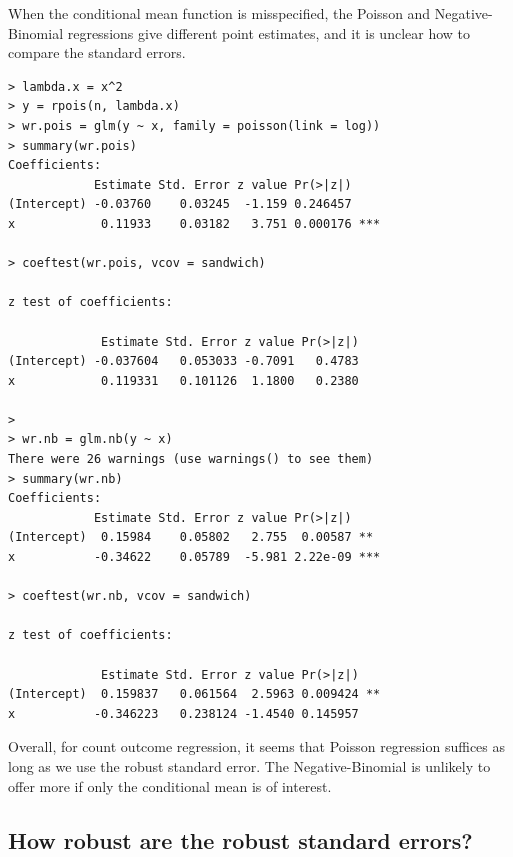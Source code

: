 When the conditional mean function is misspecified, the Poisson and Negative-Binomial regressions give different point estimates, and it is unclear how to compare the standard errors. 

\begin{lstlisting}
> lambda.x = x^2
> y = rpois(n, lambda.x)
> wr.pois = glm(y ~ x, family = poisson(link = log))
> summary(wr.pois)
Coefficients:
            Estimate Std. Error z value Pr(>|z|)    
(Intercept) -0.03760    0.03245  -1.159 0.246457    
x            0.11933    0.03182   3.751 0.000176 ***

> coeftest(wr.pois, vcov = sandwich)

z test of coefficients:

             Estimate Std. Error z value Pr(>|z|)
(Intercept) -0.037604   0.053033 -0.7091   0.4783
x            0.119331   0.101126  1.1800   0.2380

> 
> wr.nb = glm.nb(y ~ x)
There were 26 warnings (use warnings() to see them)
> summary(wr.nb)
Coefficients:
            Estimate Std. Error z value Pr(>|z|)    
(Intercept)  0.15984    0.05802   2.755  0.00587 ** 
x           -0.34622    0.05789  -5.981 2.22e-09 ***

> coeftest(wr.nb, vcov = sandwich)

z test of coefficients:

             Estimate Std. Error z value Pr(>|z|)   
(Intercept)  0.159837   0.061564  2.5963 0.009424 **
x           -0.346223   0.238124 -1.4540 0.145957   
\end{lstlisting}


Overall, for count outcome regression, it seems that Poisson regression suffices as long as we use the robust standard error. The Negative-Binomial is unlikely to offer more if only the conditional mean is of interest. 




%
%

 


\subsection{How robust are the robust standard errors?}


